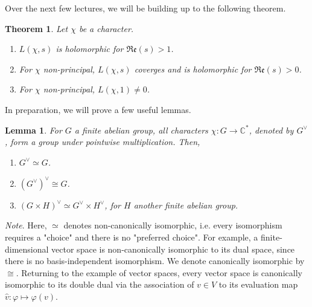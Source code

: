 \documentclass[12pt]{article}
\newcommand{\complex}{\mathbb{C}}
\newtheorem{thm}{Theorem}
\newtheorem{lemma}{Lemma}
\numberwithin{equation}{section}
\numberwithin{thm}{section}
\numberwithin{lemma}{section}
\begin{document}
Over the next few lectures, we will be building up to the following theorem.

\begin{thm}\label{LFunctionTheorem1} Let $\chi$ be a character.
  \begin{enumerate}
    \item $L(\chi, s)$ is holomorphic for $\mathfrak{Re}(s) > 1$.
    \item For $\chi$ non-principal, $L(\chi, s)$ coverges and is holomorphic for $\mathfrak{Re}(s) > 0$.
    \item For $\chi$ non-principal, $L(\chi, 1) \ne 0$.
  \end{enumerate}
\end{thm}

In preparation, we will prove a few useful lemmas. 

\begin{lemma}\label{DualIsomorphismTheorem}
  For $G$ a finite abelian group, all characters $\chi: G \to \complex^*$, denoted by $G^{\vee}$, form a group under pointwise multiplication. Then,
  \begin{enumerate}
    \item $G^{\vee} \simeq G$.
    \item $(G^{\vee})^{\vee} \cong G$.
    \item $(G \times H)^{\vee} \simeq G^{\vee} \times H^{\vee}$, for $H$ another finite abelian group.
  \end{enumerate}
\end{lemma}

\textit{Note}. Here, $\simeq$ denotes non-canonically isomorphic, i.e. every isomorphism requires a "choice" and there is no "preferred choice". For example, a finite-dimensional vector space is non-canonically isomorphic to its dual space, since there is no basis-independent isomorphism. We denote canonically isomorphic by $\cong$. Returning to the example of vector spaces, every vector space is canonically isomorphic to its double dual via the association of $v \in V$ to its evaluation map $\widehat{v}: \varphi \mapsto \varphi(v)$.
\end{document}
